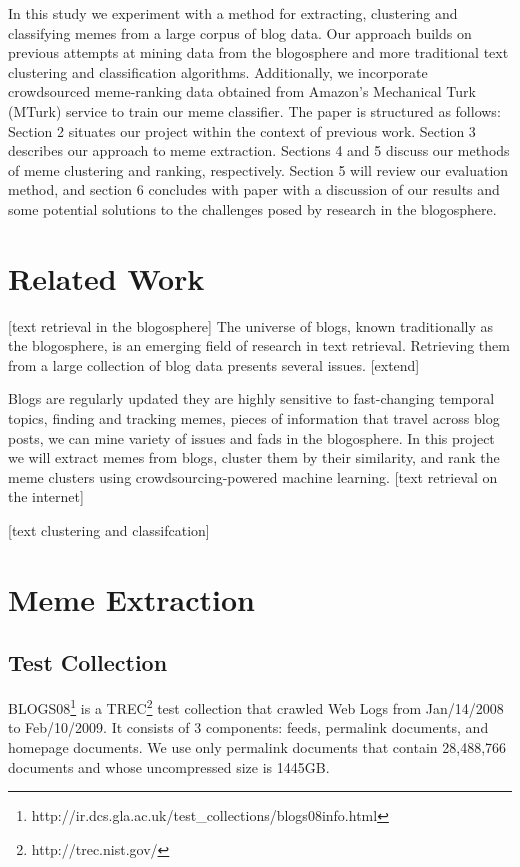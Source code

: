 \documentclass{sig-alternate}
\begin{document}
   In this study we experiment with a method for extracting, clustering and classifying memes from a large corpus of blog data.  Our approach builds on previous attempts at mining data from the blogosphere and more traditional text clustering and classification algorithms.  Additionally, we incorporate crowdsourced meme-ranking data obtained from Amazon's Mechanical Turk (MTurk) service to train our meme classifier.  The paper is structured as follows: Section 2 situates our project within the context of previous work.  Section 3 describes our approach to meme extraction.  Sections 4 and 5 discuss our methods of meme clustering and ranking, respectively.  Section 5 will review our evaluation method, and section 6 concludes with paper with a discussion of our results and some potential solutions to the challenges posed by research in the blogosphere.

\section{Related Work}
[text retrieval in the blogosphere]
The universe of blogs, known traditionally as the blogosphere, is an emerging field of research in text retrieval.  
Retrieving them from a large collection of blog data presents several issues. [extend] 

Blogs are regularly updated they are highly sensitive to fast-changing temporal topics, finding and tracking memes, pieces of information that travel across blog posts, we can mine variety of issues and fads in the blogosphere. In this project we will extract memes from blogs, cluster them by their similarity, and rank the meme clusters using crowdsourcing-powered machine learning.
[text retrieval on the internet]

[text clustering and classifcation]

\section{Meme Extraction}

\subsection{Test Collection}

BLOGS08\footnote{http://ir.dcs.gla.ac.uk/test\_collections/blogs08info.html} is a TREC\footnote{http://trec.nist.gov/} test collection that crawled Web Logs from Jan/14/2008 to Feb/10/2009. It consists of 3 components: feeds, permalink documents, and homepage documents. We use only permalink documents that contain 28,488,766 documents and whose uncompressed size is 1445GB. 
\end{document}
